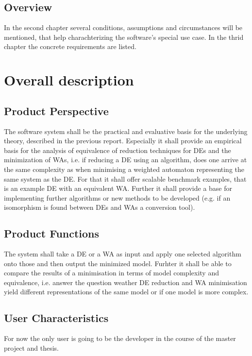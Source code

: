         
        \subsection{Overview}
            In the second chapter several conditions, assumptions and circumstances will be mentioned, that help charachterizing the software's special use case. In the thrid chapter the concrete requirements are listed.
    \newpage
            
            
    \section{Overall description}
        \subsection{Product Perspective}
            The software system shall be the practical and evaluative basis for the underlying theory, described in the previous report. Especially it shall provide an empirical basis for the analysis of equivalence of reduction techniques for DEs and the minimization of WAs, i.e. if reducing a DE using an algorithm, does one arrive at the same complexity as when minimising a weighted automaton representing the same system as the DE. For that it shall offer scalable benchmark examples, that is an example DE with an equivalent WA. Further it shall provide a base for implementing further algorithms or new methods to be developed (e.g. if an isomorphism is found between DEs and WAs a conversion tool).

        \subsection{Product Functions}
            The system shall take a DE or a WA as input and apply one selected algorithm onto those and then output the minimized model. Furhter it shall be able to compare the results of a minimisation in terms of model complexity and equivalence, i.e. answer the question weather DE reduction and WA minimisation yield different representations of the same model or if one model is more complex.

        \subsection{User Characteristics}
            For now the only user is going to be the developer in the course of the master project and thesis. 

